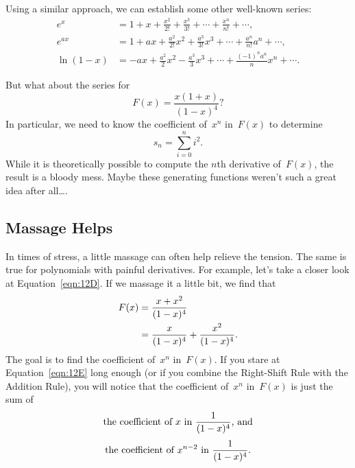 Using a similar approach, we can establish some other well-known
series:
\begingroup
{}
\begin{align*}
e^x
    &= 1 + x + \frac{x^2}{2!} + \frac{x^3}{3!} + \cdots +
        \frac{x^n}{n!} + \cdots, \\
%
e^{ax}
    &= 1 + ax + \frac{a^2}{2!} x^2 + \frac{a^3}{3!} x^3 + \cdots +
        \frac{a^n}{n!} a^n + \cdots, \\
%
\ln(1 - x)
    &= -a x + \frac{a^2}{2} x^2 - \frac{a^3}{3} x^3 + \cdots 
        + \frac{(-1)^n a^n}{n} x^n + \cdots.
\end{align*}
\endgroup

But what about the series for
\begin{equation}\label{eqn:12D}
    F(x) = \frac{x (1 + x)}{(1 - x)^4} ?
\end{equation}
In particular, we need to know the coefficient of~$x^n$ in~$F(x)$ to
determine
\begin{equation*}
    s_n = \sum_{i = 0}^n i^2.
\end{equation*}
While it is theoretically possible to compute the $n$th derivative
of~$F(x)$, the result is a bloody mess.  Maybe these generating
functions weren't such a great idea after all\dots.

\subsection{Massage Helps}

In times of stress, a little massage can often help relieve the
tension.  The same is true for polynomials with painful derivatives.
For example, let's take a closer look at Equation~\ref{eqn:12D}.  If
we massage it a little bit, we find that
\begin{align}
F(x)    &= \frac{x + x^2}{(1 - x)^4} \notag\\
        &= \frac{x}{(1 - x)^4} + \frac{x^2}{(1 - x)^4}. \label{eqn:12E}
\end{align}
The goal is to find the coefficient of~$x^n$ in~$F(x)$.  If you stare
at Equation~\ref{eqn:12E} long enough (or if you combine the
Right-Shift Rule with the Addition Rule), you will notice that the
coefficient of~$x^n$ in~$F(x)$ is just the sum of
\begin{gather*}
    \text{the coefficient of~$x$ in $\frac{1}{(1 - x)^4}$, and}
\\[\smallskipamount]
    \text{the coefficient of~$x^{n - 2}$ in $\frac{1}{(1 - x)^4}$}.
\end{gather*}

